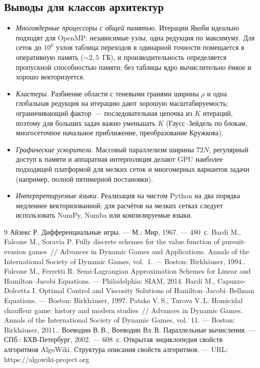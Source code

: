 \documentclass[14pt,a4paper]{extarticle}
\begin{document}
\subsection{Выводы для классов архитектур}

\begin{itemize}
	\item \emph{Многоядерные процессоры с общей памятью.} Итерации Якоби
	идеально подходят для OpenMP: независимые узлы, одна редукция по
	максимуму. Для сеток до $10^6$ узлов таблица переходов в одинарной
	точности помещается в оперативную память ($\sim 2{,}5$~ГБ), и
	производительность определяется пропускной способностью памяти;
	без таблицы ядро вычислительно ёмкое и хорошо векторизуется.
	\item \emph{Кластеры.} Разбиение области с теневыми гранями ширины $\rho$
	и одна глобальная редукция на итерацию дают хорошую масштабируемость;
	ограничивающий фактор~--- последовательная цепочка из $K$ итераций,
	поэтому для больших задач важно уменьшать $K$ (Гаусс--Зейдель
	по блокам, многосеточное начальное приближение, преобразование Кружкова).
	\item \emph{Графические ускорители.} Массовый параллелизм ширины
	$72N$, регулярный доступ к памяти и аппаратная интерполяция делают GPU
	наиболее подходящей платформой для мелких сеток и многомерных
	вариантов задачи (например, полной пятимерной постановки).
	\item \emph{Интерпретируемые языки.} Реализация на чистом Python на два
	порядка медленнее векторизованной; для расчётов на мелких сетках
	следует использовать NumPy, Numba или компилируемые языки.
\end{itemize}

\begin{thebibliography}{9}
	 Айзекс Р. Дифференциальные игры. --- М.: Мир, 1967. --- 480~с.
	 Bardi M., Falcone M., Soravia P. Fully discrete schemes for the value function of pursuit-evasion games~// Advances in Dynamic Games and Applications. Annals of the International Society of Dynamic Games, vol.~1. --- Boston: Birkhäuser, 1994..
	 Falcone M., Ferretti R. Semi-Lagrangian Approximation Schemes for Linear and Hamilton--Jacobi Equations. --- Philadelphia: SIAM, 2014.
	 Bardi M., Capuzzo-Dolcetta I. Optimal Control and Viscosity Solutions of Hamilton--Jacobi--Bellman Equations. --- Boston: Birkhäuser, 1997.
	 Patsko V.\,S., Turova V.\,L. Homicidal chauffeur game: history and modern studies~// Advances in Dynamic Games. Annals of the International Society of Dynamic Games, vol.~11. --- Boston: Birkhäuser, 2011..
	 Воеводин В.\,В., Воеводин Вл.\,В. Параллельные вычисления. --- СПб.: БХВ-Петербург, 2002. --- 608~с.
	 Открытая энциклопедия свойств алгоритмов AlgoWiki. Структура описания свойств алгоритмов. --- URL: https://algowiki-project.org
\end{thebibliography}
\end{document}
